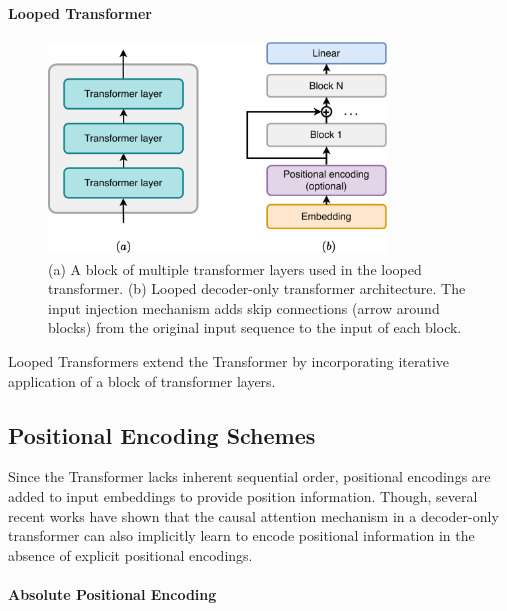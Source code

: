 \paragraph{Looped Transformer}

\begin{figure}[h!]
    \centering
    \includegraphics[width=0.8\textwidth]{fig/looped_transformer.pdf}
    \caption{(a) A block of multiple transformer layers used in the looped transformer. (b) Looped decoder-only transformer architecture. The input injection mechanism adds skip connections (arrow around blocks) from the original input sequence to the input of each block.}
    \label{fig:looped_transformer}
\end{figure}

Looped Transformers \parencite{yang_looped_2023} extend the Transformer by incorporating iterative application of a block of transformer layers.

\subsection{Positional Encoding Schemes}\label{subsec:positional_encoding}

Since the Transformer lacks inherent sequential order, positional encodings are added to input embeddings to provide position information. Though, several recent works have shown that the causal attention mechanism in a decoder-only transformer can also implicitly learn to encode positional information \parencite{zuo_breaking_2024,zhou_transformers_2024} in the absence of explicit positional encodings.

\paragraph{Absolute Positional Encoding}\label{subsec:sinusoidal_pos_enc}

